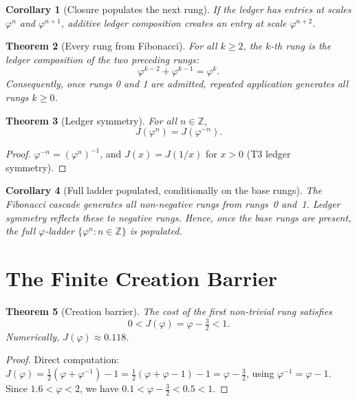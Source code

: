 \documentclass[11pt,a4paper]{article}
\newcommand{\Jcost}{J}
\newcommand{\phirs}{\varphi}
\newtheorem{theorem}{Theorem}[section]
\newtheorem{corollary}[theorem]{Corollary}
\begin{document}
\begin{corollary}[Closure populates the next rung]
\label{cor:closure_pop}
If the ledger has entries at scales $\phirs^n$ and $\phirs^{n+1}$, additive ledger composition creates an entry at scale $\phirs^{n+2}$.
\end{corollary}

\begin{theorem}[Every rung from Fibonacci]
\label{thm:all_rungs}
For all $k\geq 2$, the $k$-th rung is the ledger composition of the two preceding rungs:
\[
  \phirs^{k-2} + \phirs^{k-1} = \phirs^k.
\]
Consequently, once rungs 0 and 1 are admitted, repeated application generates all rungs $k\geq 0$.
\end{theorem}

\begin{theorem}[Ledger symmetry]
\label{thm:symmetry}
For all $n\in\mathbb Z$,
\[
  \Jcost(\phirs^n) = \Jcost(\phirs^{-n}).
\]
\end{theorem}
\begin{proof}
$\phirs^{-n}=(\phirs^n)^{-1}$, and $\Jcost(x)=\Jcost(1/x)$ for $x>0$ (T3 ledger symmetry).
\end{proof}

\begin{corollary}[Full ladder populated, conditionally on the base rungs]
The Fibonacci cascade generates all non-negative rungs from rungs~0 and~1.  Ledger symmetry reflects these to negative rungs.  Hence, once the base rungs are present, the full $\phirs$-ladder $\{\phirs^n:n\in\mathbb Z\}$ is populated.
\end{corollary}

\section{The Finite Creation Barrier}
\label{sec:barrier}

\begin{theorem}[Creation barrier]
\label{thm:barrier}
The cost of the first non-trivial rung satisfies
\[
  0 < \Jcost(\phirs) = \phirs - \tfrac32 < 1.
\]
Numerically, $\Jcost(\phirs)\approx 0.118$.
\end{theorem}
\begin{proof}
Direct computation: $\Jcost(\phirs)=\frac12(\phirs+\phirs^{-1})-1=\frac12(\phirs+\phirs-1)-1=\phirs-\frac32$, using $\phirs^{-1}=\phirs-1$.  Since $1.6<\phirs<2$, we have $0.1<\phirs-\frac32<0.5<1$.
\end{proof}
\end{document}
